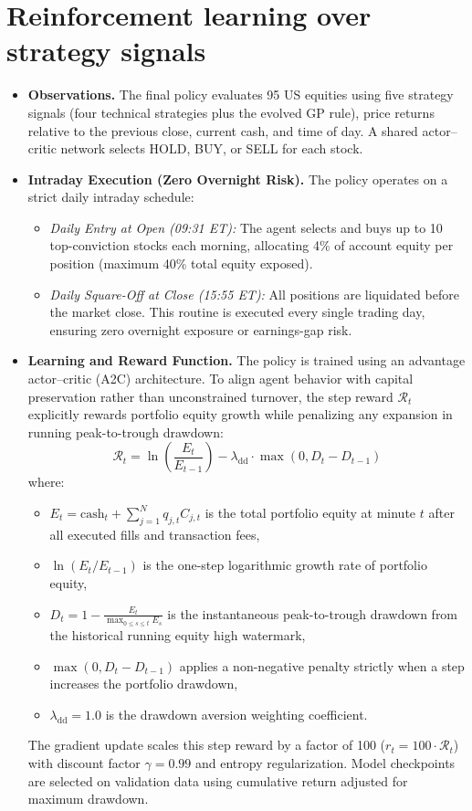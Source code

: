 \documentclass[12pt,a4paper,twoside,openany]{report}
\begin{document}
\section{Reinforcement learning over strategy signals}\label{exp:10}
\begin{itemize}
  \item \textbf{Observations.} The final policy evaluates 95 US equities using five strategy signals (four technical strategies plus the evolved GP rule), price returns relative to the previous close, current cash, and time of day. A shared actor--critic network selects HOLD, BUY, or SELL for each stock.
  \item \textbf{Intraday Execution (Zero Overnight Risk).} The policy operates on a strict daily intraday schedule:
  \begin{itemize}
    \item \textit{Daily Entry at Open (09:31 ET):} The agent selects and buys up to 10 top-conviction stocks each morning, allocating 4\% of account equity per position (maximum 40\% total equity exposed).
    \item \textit{Daily Square-Off at Close (15:55 ET):} All positions are liquidated before the market close. This routine is executed every single trading day, ensuring zero overnight exposure or earnings-gap risk.
  \end{itemize}
  \item \textbf{Learning and Reward Function.} The policy is trained using an advantage actor--critic (A2C) architecture. To align agent behavior with capital preservation rather than unconstrained turnover, the step reward $\mathcal{R}_t$ explicitly rewards portfolio equity growth while penalizing any expansion in running peak-to-trough drawdown:
  \begin{equation}
    \mathcal{R}_t = \ln\left(\frac{E_t}{E_{t-1}}\right) - \lambda_{\text{dd}} \cdot \max\left(0, D_t - D_{t-1}\right)
  \end{equation}
  where:
  \begin{itemize}[leftmargin=1.2cm, itemsep=1pt]
    \item $E_t = \text{cash}_t + \sum_{j=1}^N q_{j,t} C_{j,t}$ is the total portfolio equity at minute $t$ after all executed fills and transaction fees,
    \item $\ln(E_t / E_{t-1})$ is the one-step logarithmic growth rate of portfolio equity,
    \item $D_t = 1 - \frac{E_t}{\max_{0 \le s \le t} E_s}$ is the instantaneous peak-to-trough drawdown from the historical running equity high watermark,
    \item $\max(0, D_t - D_{t-1})$ applies a non-negative penalty strictly when a step increases the portfolio drawdown,
    \item $\lambda_{\text{dd}} = 1.0$ is the drawdown aversion weighting coefficient.
  \end{itemize}
  The gradient update scales this step reward by a factor of 100 ($r_t = 100 \cdot \mathcal{R}_t$) with discount factor $\gamma = 0.99$ and entropy regularization. Model checkpoints are selected on validation data using cumulative return adjusted for maximum drawdown.
\end{itemize}
\end{document}
